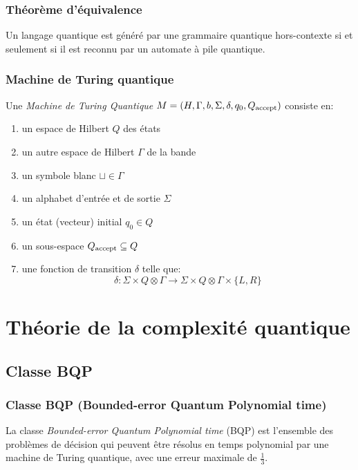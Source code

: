 \documentclass[aspectratio=169]{beamer}
\theoremstyle{plain}
\theoremstyle{definition}
\begin{document}
\begin{frame}
    \frametitle{Théorème d'équivalence}
    \begin{theorem}
        Un langage quantique est généré par une grammaire quantique hors-contexte si et seulement si il est reconnu par un automate à pile quantique.
    \end{theorem}
\end{frame}

\begin{frame}
    \frametitle{Machine de Turing quantique}
    \begin{definition}[MTQ] Une \emph{Machine de Turing Quantique} $M = (H, \Gamma, b, \Sigma, \delta, q_0, Q_{\textnormal{accept}})$ consiste en:
        \begin{enumerate}[label=--, noitemsep]
            \item un espace de Hilbert $Q$ des états
            \item un autre espace de Hilbert $\Gamma$ de la bande
            \item un symbole blanc $\sqcup\in \Gamma$
            \item un alphabet d'entrée et de sortie $\Sigma$
            \item un état (vecteur) initial $q_0\in Q$
            \item un sous-espace $Q_{\textnormal{accept}}\subseteq Q$
            \item une fonction de transition $\delta$ telle que:
            \begin{equation*}
                \delta : \Sigma \times Q\otimes \Gamma \to \Sigma \times Q\otimes \Gamma \times \{L, R\}
            \end{equation*}
        \end{enumerate}
    \end{definition}
\end{frame}

\section{Théorie de la complexité quantique}
\subsection{Classe BQP}
\begin{frame}
    \frametitle{Classe BQP (Bounded-error Quantum Polynomial time)}
    \begin{definition}[BQP] 
        La classe \emph{Bounded-error Quantum Polynomial time} (BQP) est l'ensemble des problèmes de décision qui peuvent être résolus en temps polynomial par une machine de Turing quantique, avec une erreur maximale de $\frac{1}{3}$. 
    \end{definition}
\end{frame}
\end{document}
